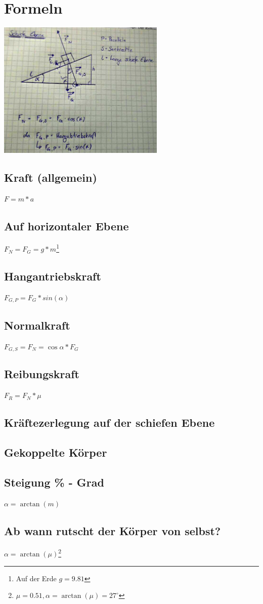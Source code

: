 \documentclass[11pt,twoside,a4paper]{article}
\title{\titleText}
\author{\authorText}
\date{\dateText}
\begin{document}
	\maketitle
	
	\section{Formeln}
	\includegraphics[width=8cm]{se1a}
	
	\begin{multicols}{2}
		\subsection{Kraft (allgemein)}
		\(F = m * a\)
		\subsection{Auf horizontaler Ebene}
		\(F_N = F_G = g * m\)\footnote{Auf der Erde \(g = 9.81\)}
		\subsection{Hangantriebskraft}
		\(F_{G,P} = F_G * sin(\alpha)\)
		\subsection{Normalkraft}
		\(F_{G,S} = F_N = \cos\alpha*F_G\)
		\subsection{Reibungskraft}
		\(F_R = F_N * \mu\)
		\subsection{Kräftezerlegung auf der schiefen Ebene}
		\subsection{Gekoppelte Körper}
		\subsection{Steigung \% - Grad}
		\(\alpha = \arctan(m) \)
		\subsection{Ab wann rutscht der Körper von selbst?}
		\(\alpha = \arctan(\mu)\)\footnote{\(\mu = 0.51, \alpha = \arctan(\mu) = 27^\circ\)}
	\end{multicols}
	
\end{document}

